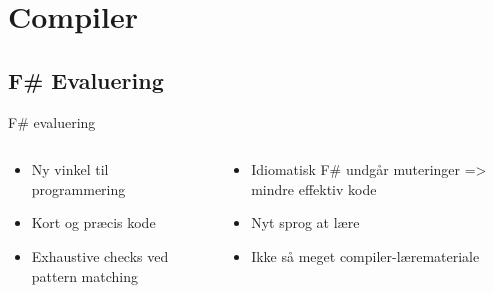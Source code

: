 \section{Compiler}

\subsection{F\# Evaluering}
\begin{frame}{F\# evaluering}
  \begin{columns}
    \begin{column}{.5\textwidth}
      \begin{itemize}
        \item Ny vinkel til programmering
        \item Kort og præcis kode
        \item Exhaustive checks ved pattern matching
      \end{itemize}
    \end{column}
    
    \begin{column}{.5\textwidth}
      \begin{itemize}
        \item Idiomatisk F\# undgår muteringer => mindre effektiv kode
        \item Nyt sprog at lære
        \item Ikke så meget compiler-læremateriale
      \end{itemize}
    \end{column}
  \end{columns}
\end{frame}

